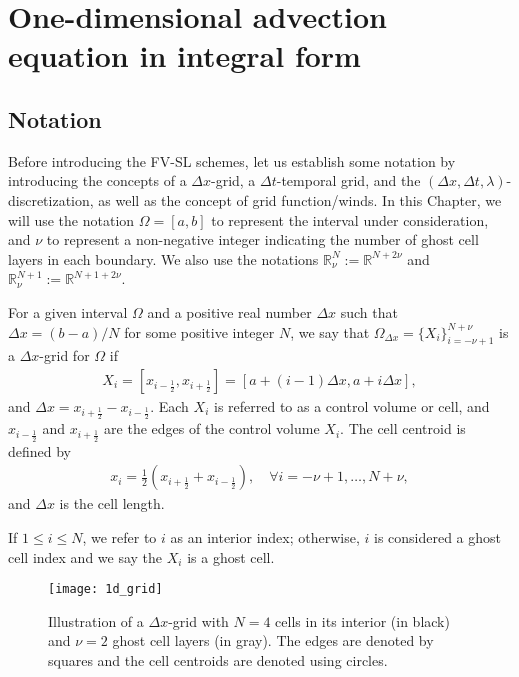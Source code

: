\section{One-dimensional advection equation in integral form}
\label{chp-adv1d-sec1}

\subsection{Notation}
\label{chp-adv1d-sec-not}
Before introducing the FV-SL schemes, let us establish some notation by introducing
the concepts of a $\Delta x$-grid, a $\Delta t$-temporal grid, and the
$(\Delta x, \Delta t, \lambda)$-discretization, as well as the concept of grid function/winds.
In this Chapter, we will use the notation $\Omega=[a,b]$ to represent the interval under consideration,
and $\nu$ to represent a non-negative integer indicating the number of ghost cell layers in each boundary.
We also use the notations $\mathbb{R}^{N}_{\nu}:=\mathbb{R}^{N+2\nu}$ and
$\mathbb{R}^{N+1}_{\nu}:=\mathbb{R}^{N+1+2\nu}$.
\begin{definition}\label{chp-adv1d-def-dxgrid}
	For a given interval $\Omega$ and a positive real number $\Delta x$ such that 
    $\Delta x = (b-a)/N$ for some positive integer $N$, 
	we say that $\Omega_{\Delta x}= \{X_i \}_{i=-\nu+1}^{N+\nu}$ is a $\Delta x$-grid for $\Omega$ if
	\begin{align*}
        X_i = [x_{i-\frac{1}{2}},x_{i+\frac{1}{2}}] = [a+(i-1)\Delta x, a+i\Delta x],
    \end{align*}
	and $\Delta x = x_{i+\frac{1}{2}} - x_{i-\frac{1}{2}}$. 
	Each $X_i$ is referred to as a control volume or cell, and $x_{i-\frac{1}{2}}$ and 
	$x_{i+\frac{1}{2}}$ are the edges of the control volume $X_i$.
	The cell centroid is defined by
    \begin{align*}
    x_i = \frac{1}{2}(x_{i+\frac{1}{2}} + x_{i-\frac{1}{2}}),\quad \forall i = -\nu+1, \ldots, N+\nu,
    \end{align*}
	and $\Delta x$ is the cell length.
\end{definition}
\begin{remark}
If $1 \leq i \leq N$, we refer to $i$ as an interior index;
otherwise, $i$ is considered a ghost cell index and we say the $X_i$ is a ghost cell.
\end{remark}

\begin{figure}[!htb]
	\centering
	\texttt{[image: 1d\_grid]}
	\caption{Illustration of a $\Delta x$-grid with $N=4$ cells in its interior (in black) 
         and $\nu=2$ ghost cell layers (in gray).
	 The edges are denoted by squares and the cell centroids are denoted using circles.\label{chp-adv1d-sec1-grid1d}}
\end{figure}

